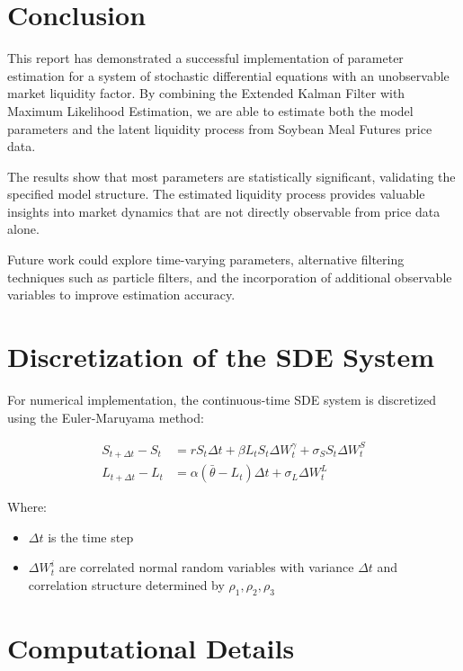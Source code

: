 \documentclass[12pt,a4paper]{article}
\begin{document}
\section{Conclusion}

This report has demonstrated a successful implementation of parameter estimation for a system of stochastic differential equations with an unobservable market liquidity factor. By combining the Extended Kalman Filter with Maximum Likelihood Estimation, we are able to estimate both the model parameters and the latent liquidity process from Soybean Meal Futures price data.

The results show that most parameters are statistically significant, validating the specified model structure. The estimated liquidity process provides valuable insights into market dynamics that are not directly observable from price data alone.

Future work could explore time-varying parameters, alternative filtering techniques such as particle filters, and the incorporation of additional observable variables to improve estimation accuracy.

\appendix
\section{Discretization of the SDE System}

For numerical implementation, the continuous-time SDE system is discretized using the Euler-Maruyama method:

\begin{align}
    S_{t+\Delta t} - S_t &= r S_t \Delta t + \beta L_t S_t \Delta W_t^{\gamma} + \sigma_S S_t \Delta W_t^S \\
    L_{t+\Delta t} - L_t &= \alpha(\bar{\theta} - L_t)\Delta t + \sigma_L \Delta W_t^L
\end{align}

Where:
\begin{itemize}
    \item $\Delta t$ is the time step
    \item $\Delta W_t^i$ are correlated normal random variables with variance $\Delta t$ and correlation structure determined by $\rho_1, \rho_2, \rho_3$
\end{itemize}

\section{Computational Details}
\end{document}
